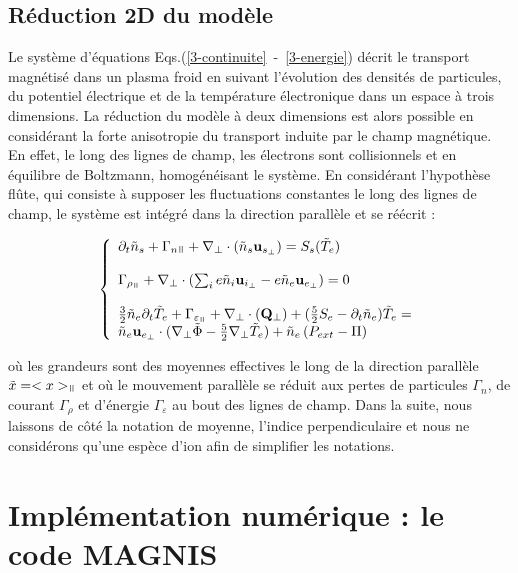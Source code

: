 \begin{refsection}
\subsection{Réduction 2D du modèle}
Le système d'équations Eqs.(\ref{3-continuite}~-~\ref{3-energie}) décrit le
transport magnétisé dans un plasma froid en suivant l'évolution des densités de
particules, du potentiel électrique et de la température électronique 
dans un espace à trois dimensions. La réduction du modèle à deux dimensions est
alors possible en considérant la forte anisotropie du transport induite par le champ magnétique.
En effet, le long des lignes de champ, les électrons sont collisionnels et en équilibre de 
Boltzmann, homogénéisant le système. 
En considérant l'hypothèse flûte, qui consiste à supposer les fluctuations constantes
le long des lignes de champ, le système est intégré dans la direction parallèle et se
réécrit :

\begin{equation}
\label{3-equations2D}
\left\{\begin{array}{lr}
\partial_t \tilde{n}_s + \Gamma_{n\para} +
\nabla_\perp\cdot\left(\tilde{n}_s\mathbf{u}_{s_\perp}\right)=S_s(\tilde{T}_e)
\\\\
\Gamma_{\rho_\para}+\nabla_\perp\cdot(\sum_ie\tilde{n}_i\mathbf{u}_{i_\perp}
-e\tilde{n}_e\mathbf{u}_{e_\perp})=0
\\\\
\frac{3}{2}\tilde{n}_e\partial_t\tilde{T}_e + \Gamma_{\varepsilon_\para}+\nabla_\perp\cdot(\mathbf{Q}_\perp) +
(\frac{5}{2}S_e-\partial_t\tilde{n}_e)\tilde{T}_e =\\\tilde{n}_e\mathbf{u}_{e_\perp}\cdot(\nabla_\perp
\tilde{\Phi}-\frac{5}{2}\nabla_\perp \tilde{T}_e)+\tilde{n}_e\left(P_{ext}-\Pi\right)
\end{array}\right.
\end{equation}

où les grandeurs sont des moyennes effectives le long de la direction parallèle $\tilde{x}=<x>_\para$ 
et où le mouvement parallèle se réduit aux pertes de particules $\Gamma_n$, de courant $\Gamma_\rho$ et d'énergie $\Gamma_\varepsilon$
au bout des lignes de champ. Dans la suite, nous laissons de côté
la notation de moyenne, l'indice perpendiculaire et nous ne considérons qu'une espèce d'ion afin de simplifier les notations.

\section{Implémentation numérique : le code MAGNIS}


\end{refsection}
